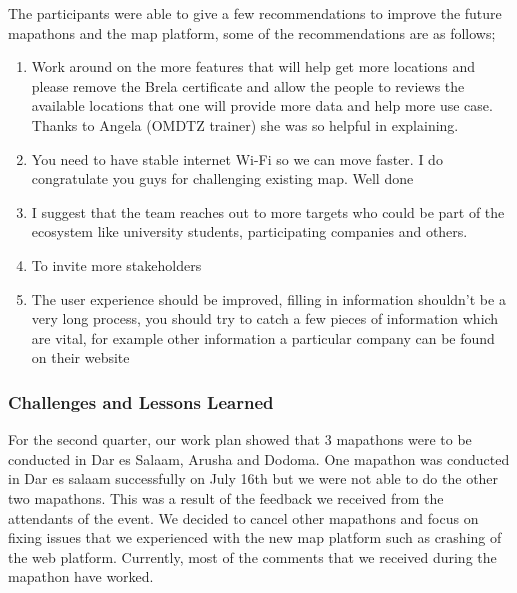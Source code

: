 \documentclass[a4paper,12pt,twoside]{article}
\begin{document}
The participants were able to give a few recommendations to improve the future mapathons and the map platform, some of the recommendations are as follows;

\begin{enumerate}
	\item Work around on the more features that will help get more locations and please remove the Brela certificate and allow the people to reviews the available locations that one will provide more data and help more use case. Thanks to Angela (OMDTZ trainer) she was so helpful in explaining.
	\item You need to have stable internet Wi-Fi so we can move faster. I do congratulate you guys for challenging existing map. Well done
	\item I suggest that the team reaches out to more targets who could be part of the ecosystem like university students, participating companies and others.
	\item To invite more stakeholders
	\item The user experience should be improved, filling in information shouldn't be a very long process, you should try to catch a few pieces of information which are vital, for example other information a particular company can be found on their website
\end{enumerate}

\subsubsection{Challenges and Lessons Learned}
For the second quarter, our work plan showed that 3 mapathons were to be conducted in Dar es Salaam, Arusha and Dodoma. One mapathon was conducted in Dar es salaam successfully on July 16th but we were not able to do the other two mapathons. This was a result of the feedback we received from the attendants of the event. We decided to cancel other mapathons and focus on fixing issues that we experienced with the new map platform such as crashing of the web platform. Currently, most of the comments that we received during the mapathon have worked.
\end{document}
